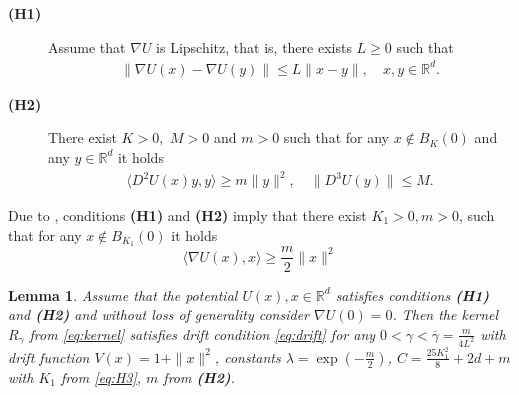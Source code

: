 \documentclass[bj]{imsart}
\newtheorem{lem}[thm]{Lemma}
\begin{document}
\begin{description}
\item[{\bf (H1)}] Assume that $\nabla U$ is Lipschitz, that is, there exists $L\geq 0$ such that 
\begin{eqnarray*}
\|\nabla U(x)-\nabla U(y)\|\leq L\|x-y\|, \quad x,y\in \mathbb{R}^d.
\end{eqnarray*}

\item[{\bf (H2)}] There exist $K>0,$ $M>0$ and $m>0$ such that for any $x\not\in B_K(0)	$ and any $y\in \mathbb{R}^d$ it holds 
\begin{eqnarray*}
\langle D^2U(x)y,y\rangle \geq m\|y\|^2, \quad \|D^3 U(y)\| \leq M. 
\end{eqnarray*}
\end{description}

Due to \cite[Lemma~14]{brosse:2018:diffusion}, conditions {\bf (H1)} and {\bf (H2)} imply that there exist $K_1 > 0, m > 0$, such that for any $x \not\in B_{K_1}(0)$ it holds
\begin{equation}
\label{eq:H3}
\langle \nabla U(x), x \rangle \geq \frac{m}{2}\|x\|^2
\end{equation}

\begin{lem} Assume that the potential $U(x), x \in \mathbb{R}^d$ satisfies conditions {\bf (H1)} and {\bf (H2)} and without loss of generality consider $\nabla U(0) = 0$. Then the kernel $R_\gamma$ from \ref{eq:kernel} satisfies drift condition \ref{eq:drift} for any $0 < \gamma < \overline{\gamma} = \frac{m}{4L^2}$ with drift function $V(x) = 1 + \|x\|^2$, constants $\lambda = \exp{\left(-\frac{m}{2}\right)}$, $C = \frac{25K_1^2}{8} + 2d + m$ with $K_1$ from \ref{eq:H3}, $m$ from {\bf (H2)}. 
\end{lem}
\end{document}
